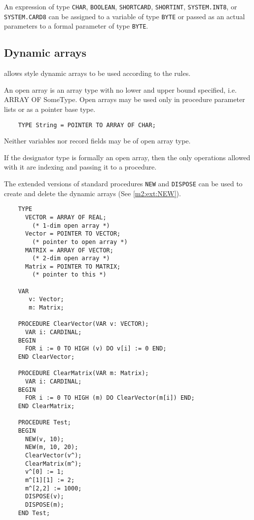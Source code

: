 \mextonly

An expression of type {\tt CHAR}, {\tt BOOLEAN}, {\tt SHORTCARD}, {\tt SHORTINT},
{\tt SYSTEM.INT8}, or {\tt SYSTEM.CARD8} can
be  assigned to a variable of type  {\tt BYTE} or passed as an actual
parameters to a formal parameter of type {\tt BYTE}.

\subsection{Dynamic arrays}\label{m2:ext:dynarrs}

\mextonly

\xds{} allows \ot{} style dynamic arrays to be used
according to the \ot{} rules.

An open array is an array type with no lower and upper bound
specified, i.e. ARRAY OF SomeType. Open arrays may be used only
in procedure parameter lists or as a pointer base type.

\verb'    TYPE String = POINTER TO ARRAY OF CHAR;'

Neither variables nor record fields may be
of open array type.

If the designator type is formally an open array, then the only
operations allowed with it are indexing and passing it to a
procedure.

The extended versions of standard procedures {\tt NEW} and
{\tt DISPOSE} can be used to create and delete the dynamic arrays
(See \ref{m2:ext:NEW}).

\Example
\begin{verbatim}
    TYPE
      VECTOR = ARRAY OF REAL;
        (* 1-dim open array *)
      Vector = POINTER TO VECTOR;
        (* pointer to open array *)
      MATRIX = ARRAY OF VECTOR;
        (* 2-dim open array *)
      Matrix = POINTER TO MATRIX;
        (* pointer to this *)

    VAR
       v: Vector;
       m: Matrix;

    PROCEDURE ClearVector(VAR v: VECTOR);
      VAR i: CARDINAL;
    BEGIN
      FOR i := 0 TO HIGH (v) DO v[i] := 0 END;
    END ClearVector;

    PROCEDURE ClearMatrix(VAR m: Matrix);
      VAR i: CARDINAL;
    BEGIN
      FOR i := 0 TO HIGH (m) DO ClearVector(m[i]) END;
    END ClearMatrix;

    PROCEDURE Test;
    BEGIN
      NEW(v, 10);
      NEW(m, 10, 20);
      ClearVector(v^);
      ClearMatrix(m^);
      v^[0] := 1;
      m^[1][1] := 2;
      m^[2,2] := 1000;
      DISPOSE(v);
      DISPOSE(m);
    END Test;
\end{verbatim}

